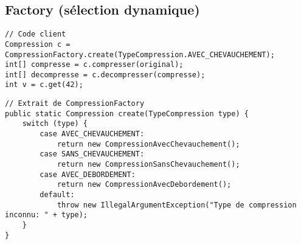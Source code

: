 \subsection{Factory (sélection dynamique)}
\begin{lstlisting}
// Code client
Compression c = CompressionFactory.create(TypeCompression.AVEC_CHEVAUCHEMENT);
int[] compresse = c.compresser(original);
int[] decompresse = c.decompresser(compresse);
int v = c.get(42);
\end{lstlisting}

\begin{lstlisting}
// Extrait de CompressionFactory
public static Compression create(TypeCompression type) {
	switch (type) {
		case AVEC_CHEVAUCHEMENT:
			return new CompressionAvecChevauchement();
		case SANS_CHEVAUCHEMENT:
			return new CompressionSansChevauchement();
		case AVEC_DEBORDEMENT:
			return new CompressionAvecDebordement();
		default:
			throw new IllegalArgumentException("Type de compression inconnu: " + type);
	}
}
\end{lstlisting}
